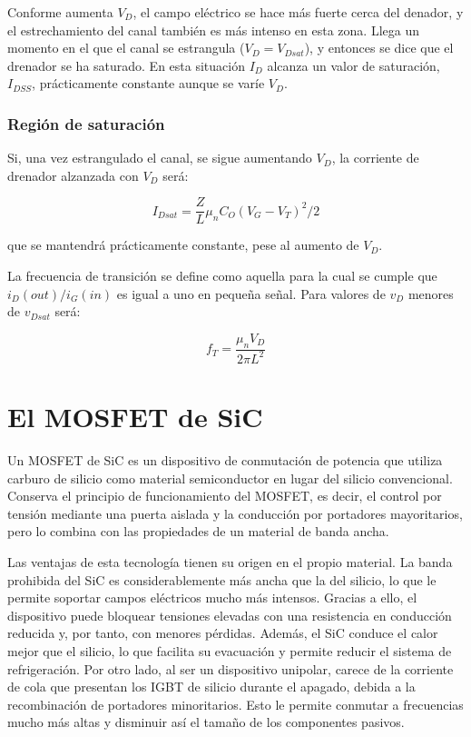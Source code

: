 Conforme aumenta $V_D$, el campo eléctrico se hace más fuerte cerca del denador, y el estrechamiento del canal también es más intenso en esta zona. Llega un momento en el que el canal se estrangula ($V_D = V_{Dsat}$), y entonces se dice que el drenador se ha saturado. En esta situación $I_D$ alcanza un valor de saturación, $I_{DSS}$, prácticamente constante aunque se varíe $V_D$.

\subsubsection{Región de saturación}

Si, una vez estrangulado el canal, se sigue aumentando $V_D$, la corriente de drenador alzanzada con $V_D$ será:

\begin{equation}
    I_{Dsat} = \frac{Z}{L} \mu_n C_O (V_G - V_T)^2 / 2
\end{equation}

que se mantendrá prácticamente constante, pese al aumento de $V_D$.

La frecuencia de transición se define como aquella para la cual se cumple que $i_D (out) / i_G (in)$ es igual a uno en pequeña señal. Para valores de $v_D$ menores de $v_{Dsat}$ será:

\begin{equation}
    f_T = \frac{\mu_n V_D}{2 \pi L^2}
\end{equation}

\section{El MOSFET de SiC}

Un MOSFET de SiC es un dispositivo de conmutación de potencia que utiliza carburo de silicio como material semiconductor en lugar del silicio convencional. Conserva el principio de funcionamiento del MOSFET, es decir, el control por tensión mediante una puerta aislada y la conducción por portadores mayoritarios, pero lo combina con las propiedades de un material de banda ancha.

Las ventajas de esta tecnología tienen su origen en el propio material. La banda prohibida del SiC es considerablemente más ancha que la del silicio, lo que le permite soportar campos eléctricos mucho más intensos. Gracias a ello, el dispositivo puede bloquear tensiones elevadas con una resistencia en conducción reducida y, por tanto, con menores pérdidas. Además, el SiC conduce el calor mejor que el silicio, lo que facilita su evacuación y permite reducir el sistema de refrigeración. Por otro lado, al ser un dispositivo unipolar, carece de la corriente de cola que presentan los IGBT de silicio durante el apagado, debida a la recombinación de portadores minoritarios. Esto le permite conmutar a frecuencias mucho más altas y disminuir así el tamaño de los componentes pasivos.

